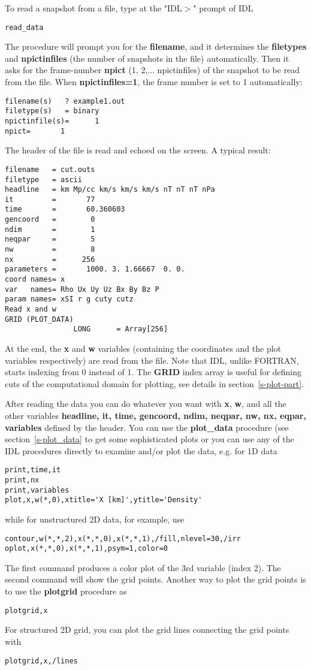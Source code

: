 \documentclass{article}
\begin{document}
To read a snapshot from a file, type at the "IDL$>$" prompt of IDL
\begin{verbatim}
read_data
\end{verbatim}
The procedure will prompt you for the {\bf filename}, 
and it determines the {\bf filetypes} and {\bf npictinfiles}
(the number of snapshots in the file) automatically. Then it asks for
the frame-number {\bf npict} (1, 2,... npictinfiles) 
of the snapshot to be read from the file. When {\bf npictinfiles=1},
the frame number is set to 1 automatically:
\begin{verbatim}
filename(s)   ? example1.out
filetype(s)   = binary
npictinfile(s)=      1
npict=       1
\end{verbatim}
The header of the file is read and echoed on the screen. 
A typical result:
\begin{verbatim}
filename   = cut.outs
filetype   = ascii
headline   = km Mp/cc km/s km/s km/s nT nT nT nPa
it         =       77
time       =       60.360603
gencoord   =        0
ndim       =        1
neqpar     =        5
nw         =        8
nx         =      256
parameters =       1000. 3. 1.66667  0. 0.
coord names= x
var   names= Rho Ux Uy Uz Bx By Bz P
param names= xSI r g cuty cutz
Read x and w
GRID (PLOT_DATA)
                LONG      = Array[256]
\end{verbatim}
At the end, the {\bf x} and {\bf w} variables (containing the coordinates 
and the plot variables respectively) are read from the file. 
Note that IDL, unlike FORTRAN, starts indexing from 0 instead of 1. 
The {\bf GRID} index array is useful for defining
cuts of the computational domain for plotting, see details 
in section~\ref{s-plot-part}. 

After reading the data you can do whatever you want with {\bf x}, {\bf w}, 
and all the other variables 
{\bf headline, it, time, gencoord, ndim, neqpar, nw, nx, eqpar, variables}
defined by the header. 
You can use the {\bf plot\_data} procedure (see section~\ref{s-plot_data}
to get some sophisticated plots or you can use any of the IDL procedures 
directly to examine and/or plot the data, e.g. for 1D data
\begin{verbatim}
print,time,it
print,nx
print,variables
plot,x,w(*,0),xtitle='X [km]',ytitle='Density'
\end{verbatim}
while for unstructured 2D data, for example, use
\begin{verbatim}
contour,w(*,*,2),x(*,*,0),x(*,*,1),/fill,nlevel=30,/irr
oplot,x(*,*,0),x(*,*,1),psym=1,color=0
\end{verbatim}
The first command produces a color plot of the 3rd variable (index 2).
The second command will show the grid points. Another way to plot the
grid points is to use the {\bf plotgrid} procedure as
\begin{verbatim}
plotgrid,x
\end{verbatim}
For structured 2D grid, you can plot the grid lines connecting
the grid points with 
\begin{verbatim}
plotgrid,x,/lines
\end{verbatim}
\end{document}
